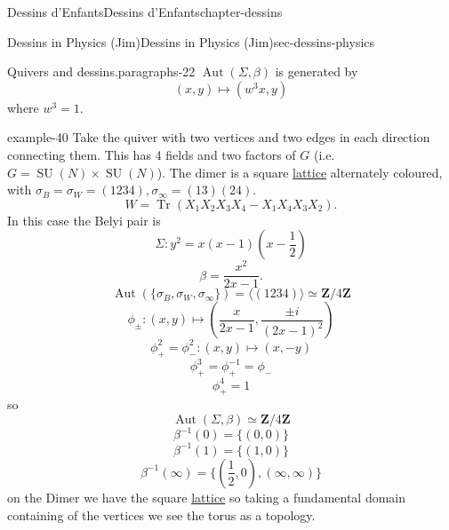 \documentclass[oneside,10pt,]{book}
\numberwithin{equation}{section}
\newcommand{\inv}{^{-1}}
\newcommand{\ZZ}{\mathbf{Z}}
\DeclareMathOperator{\trace}{Tr}
\DeclareMathOperator{\Aut}{Aut}
\DeclareMathOperator{\specialunitary}{SU}
\begin{document}
\begin{chapterptx}{Dessins d'Enfants}{}{Dessins d'Enfants}{}{}{chapter-dessins}
\begin{sectionptx}{Dessins in Physics (Jim)}{}{Dessins in Physics (Jim)}{}{}{sec-dessins-physics}
\begin{paragraphs}{Quivers and dessins.}{paragraphs-22}
\(\Aut(\Sigma, \beta)\) is generated by%
\begin{equation*}
(x,y) \mapsto (w^3 x,y)
\end{equation*}
where \(w^3 = 1\).%
\begin{example}{}{example-40}%
\hypertarget{p-780}{}%
Take the quiver with two vertices and two edges in each direction connecting them. This has 4 fields and two factors of \(G\) (i.e. \(G = \specialunitary (N) \times \specialunitary (N)\)). The dimer is a square \hyperref[def-buntes-lattice]{lattice} alternately coloured, with \(\sigma_B = \sigma_W = (1234), \sigma_\infty = (13)(24)\).%
\begin{equation*}
W = \trace (X_1X_2X_3X_4 - X_1 X_4 X_3 X_2)\text{.}
\end{equation*}
In this case the Belyi pair is%
\begin{equation*}
\Sigma \colon y^2= x(x-1)(x-\frac12)
\end{equation*}
%
\begin{equation*}
\beta = \frac{x^2}{2x-1}\text{.}
\end{equation*}
%
\begin{equation*}
\Aut(\{\sigma_B,\sigma_W, \sigma_\infty\}) = \langle (1234) \rangle \simeq \ZZ/4\ZZ
\end{equation*}
%
\begin{equation*}
\phi_\pm \colon (x,y) \mapsto \left(\frac{x}{2x -1},\frac{\pm i}{(2x-1)^2} \right)
\end{equation*}
%
\begin{equation*}
\phi_+^2 = \phi_-^2 \colon (x,y) \mapsto (x,-y)
\end{equation*}
%
\begin{equation*}
\phi_+^3 = \phi_+\inv = \phi_-
\end{equation*}
%
\begin{equation*}
\phi_+^4 = 1
\end{equation*}
so%
\begin{equation*}
\Aut(\Sigma, \beta) \simeq \ZZ/4\ZZ
\end{equation*}
%
\begin{equation*}
\beta\inv(0)= \{(0,0)\}
\end{equation*}
%
\begin{equation*}
\beta\inv(1)= \{(1,0)\}
\end{equation*}
%
\begin{equation*}
\beta\inv(\infty)= \{(\frac 12,0), (\infty,\infty)\}
\end{equation*}
on the Dimer we have the square \hyperref[def-buntes-lattice]{lattice} so taking a fundamental domain containing  of the vertices we see the torus as a topology.%

\end{example}
\end{paragraphs}
\end{sectionptx}
\end{chapterptx}
\end{document}
